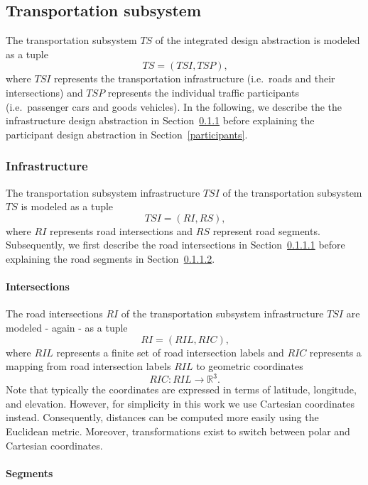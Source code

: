 \subsection{Transportation subsystem}
\label{transport}

The transportation subsystem $TS$ of the integrated design abstraction is modeled as a tuple
\[
	TS = (TSI, TSP) \textrm{,}
\]
where $TSI$ represents the transportation infrastructure (i.e.\ roads and their intersections) and $TSP$ represents the individual traffic participants (i.e.\ passenger cars and goods vehicles). In the following, we describe the the infrastructure design abstraction in Section~\ref{transport_infrastructure} before explaining the participant design abstraction in Section~\ref{participants}.

\subsubsection{Infrastructure}
\label{transport_infrastructure}

The transportation subsystem infrastructure $TSI$ of the transportation subsystem $TS$ is modeled as a tuple
\[
	TSI = (RI, RS) \textrm{,}
\]
where $RI$ represents road intersections and $RS$ represent road segments. Subsequently, we first describe the road intersections in Section~\ref{intersections} before explaining the road segments in Section~\ref{segments}.

\paragraph{Intersections}
\label{intersections}

The road intersections $RI$ of the transportation subsystem infrastructure $TSI$ are modeled - again - as a tuple
\[
	RI = (RIL, RIC) \textrm{,}
\]
where $RIL$ represents a finite set of road intersection labels and $RIC$ represents a mapping from road intersection labels $RIL$ to geometric coordinates
\[
	RIC: RIL \rightarrow \mathbb{R}^3 \mathrm{.}
\]
Note that typically the coordinates are expressed in terms of latitude, longitude, and elevation. However, for simplicity in this work we use Cartesian coordinates instead. Consequently, distances can be computed more easily using the Euclidean metric. Moreover, transformations exist to switch between polar and Cartesian coordinates.

\paragraph{Segments}
\label{segments}

